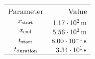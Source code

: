 \begin{tabular}{cr}
    \toprule
    Parameter & Value \\ \otoprule
    $x_{\textup{start}}$    & $\unit[1.17 \cdot 10^{2}]{m}$ \\
    $x_{\textup{end}}$      & $\unit[5.56 \cdot 10^{2}]{m}$ \\
    $t_{\textup{start}}$    & $\unit[8.00 \cdot 10^{-1}]{s}$ \\
    $t_{\textup{duration}}$ & $\unit[3.34 \cdot 10^{1}]{s}$ \\
    \bottomrule
\end{tabular}
